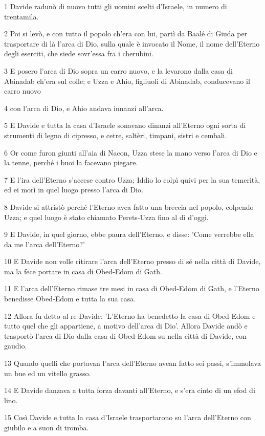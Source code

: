 \par 1 Davide radunò di nuovo tutti gli uomini scelti d'Israele, in numero di trentamila.
\par 2 Poi si levò, e con tutto il popolo ch'era con lui, partì da Baalé di Giuda per trasportare di là l'arca di Dio, sulla quale è invocato il Nome, il nome dell'Eterno degli eserciti, che siede sovr'essa fra i cherubini.
\par 3 E posero l'arca di Dio sopra un carro nuovo, e la levarono dalla casa di Abinadab ch'era sul colle; e Uzza e Ahio, figliuoli di Abinadab, conducevano il carro nuovo
\par 4 con l'arca di Dio, e Ahio andava innanzi all'arca.
\par 5 E Davide e tutta la casa d'Israele sonavano dinanzi all'Eterno ogni sorta di strumenti di legno di cipresso, e cetre, saltèri, timpani, sistri e cembali.
\par 6 Or come furon giunti all'aia di Nacon, Uzza stese la mano verso l'arca di Dio e la tenne, perché i buoi la facevano piegare.
\par 7 E l'ira dell'Eterno s'accese contro Uzza; Iddio lo colpì quivi per la sua temerità, ed ei morì in quel luogo presso l'arca di Dio.
\par 8 Davide si attristò perché l'Eterno avea fatto una breccia nel popolo, colpendo Uzza; e quel luogo è stato chiamato Perets-Uzza fino al dì d'oggi.
\par 9 E Davide, in quel giorno, ebbe paura dell'Eterno, e disse: 'Come verrebbe ella da me l'arca dell'Eterno?'
\par 10 E Davide non volle ritirare l'arca dell'Eterno presso di sé nella città di Davide, ma la fece portare in casa di Obed-Edom di Gath.
\par 11 E l'arca dell'Eterno rimase tre mesi in casa di Obed-Edom di Gath, e l'Eterno benedisse Obed-Edom e tutta la sua casa.
\par 12 Allora fu detto al re Davide: 'L'Eterno ha benedetto la casa di Obed-Edom e tutto quel che gli appartiene, a motivo dell'arca di Dio'. Allora Davide andò e trasportò l'arca di Dio dalla casa di Obed-Edom su nella città di Davide, con gaudio.
\par 13 Quando quelli che portavan l'arca dell'Eterno avean fatto sei passi, s'immolava un bue ed un vitello grasso.
\par 14 E Davide danzava a tutta forza davanti all'Eterno, e s'era cinto di un efod di lino.
\par 15 Così Davide e tutta la casa d'Israele trasportarono su l'arca dell'Eterno con giubilo e a suon di tromba.
